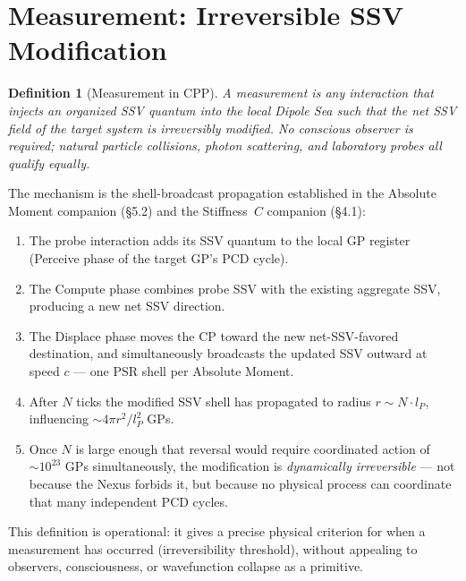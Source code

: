 \documentclass[12pt]{article}
\newtheorem{definition}[theorem]{Definition}
\newcommand{\lP}{l_P}
\begin{document}
\section{Measurement: Irreversible SSV Modification}
\label{sec:measurement}

\begin{definition}[Measurement in CPP]
\label{def:measurement}
A \emph{measurement} is any interaction that injects an organized SSV quantum
into the local Dipole Sea such that the net SSV field of the target system is
irreversibly modified.  No conscious observer is required; natural particle
collisions, photon scattering, and laboratory probes all qualify equally.
\end{definition}

The mechanism is the shell-broadcast propagation established in the Absolute
Moment companion (\S 5.2) and the Stiffness~$C$ companion (\S 4.1):
\begin{enumerate}[noitemsep]
  \item The probe interaction adds its SSV quantum to the local GP register
    (Perceive phase of the target GP's PCD cycle).
  \item The Compute phase combines probe SSV with the existing aggregate SSV,
    producing a new net SSV direction.
  \item The Displace phase moves the CP toward the new net-SSV-favored
    destination, and simultaneously broadcasts the updated SSV outward at
    speed $c$ --- one PSR shell per Absolute Moment.
  \item After $N$ ticks the modified SSV shell has propagated to radius
    $r \sim N\cdot\lP$, influencing $\sim 4\pi r^2/\lP^2$ GPs.
  \item Once $N$ is large enough that reversal would require coordinated
    action of $\sim 10^{23}$ GPs simultaneously, the modification is
    \emph{dynamically irreversible} --- not because the Nexus forbids it,
    but because no physical process can coordinate that many independent PCD
    cycles.
\end{enumerate}

This definition is operational: it gives a precise physical criterion for
when a measurement has occurred (irreversibility threshold), without
appealing to observers, consciousness, or wavefunction collapse as a
primitive.
\end{document}
